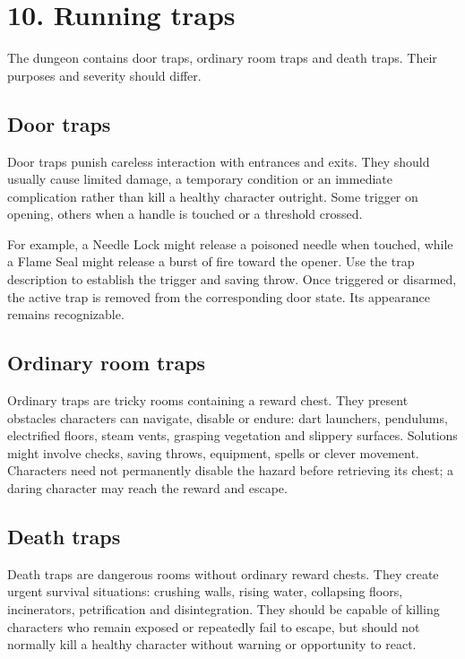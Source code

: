 \section{10. Running traps}

The dungeon contains door traps, ordinary room traps and death traps. Their purposes and severity should differ.

\subsection{Door traps}

Door traps punish careless interaction with entrances and exits. They should usually cause limited damage, a temporary condition or an immediate complication rather than kill a healthy character outright. Some trigger on opening, others when a handle is touched or a threshold crossed.

For example, a Needle Lock might release a poisoned needle when touched, while a Flame Seal might release a burst of fire toward the opener. Use the trap description to establish the trigger and saving throw. Once triggered or disarmed, the active trap is removed from the corresponding door state. Its appearance remains recognizable.

\subsection{Ordinary room traps}

Ordinary traps are tricky rooms containing a reward chest. They present obstacles characters can navigate, disable or endure: dart launchers, pendulums, electrified floors, steam vents, grasping vegetation and slippery surfaces. Solutions might involve checks, saving throws, equipment, spells or clever movement. Characters need not permanently disable the hazard before retrieving its chest; a daring character may reach the reward and escape.

\subsection{Death traps}

Death traps are dangerous rooms without ordinary reward chests. They create urgent survival situations: crushing walls, rising water, collapsing floors, incinerators, petrification and disintegration. They should be capable of killing characters who remain exposed or repeatedly fail to escape, but should not normally kill a healthy character without warning or opportunity to react.

